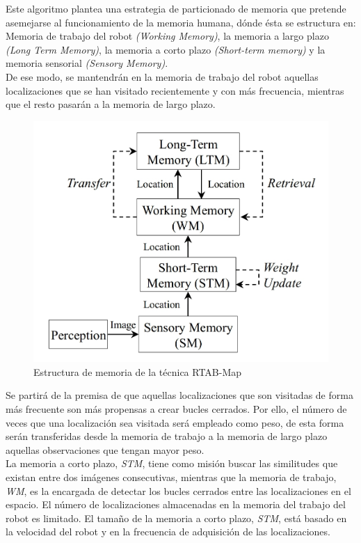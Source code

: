 Este algoritmo plantea una estrategia de particionado de memoria que pretende asemejarse al funcionamiento de la memoria humana, 
dónde ésta se estructura en: \\
Memoria de trabajo del robot \textit{(Working Memory)}, la memoria a largo plazo \textit{(Long Term Memory)}, 
la memoria a corto plazo \textit{(Short-term memory)} y la memoria sensorial \textit{(Sensory Memory)}. \\
De ese modo, se mantendrán en la memoria de trabajo del robot aquellas localizaciones que se han visitado recientemente 
y con más frecuencia, mientras que el resto pasarán a la memoria de largo plazo. \\

\begin{figure}[h!]
    \centering
    \includegraphics[width=.4\textwidth]{images/rtabmap_memory}
    \caption{Estructura de memoria de la técnica RTAB-Map}
\end{figure}


Se partirá de la premisa de que aquellas localizaciones que son visitadas de forma más frecuente son más propensas a 
crear bucles cerrados. Por ello, el número de veces que una localización sea visitada será empleado como peso, de 
esta forma serán transferidas desde la memoria de trabajo a la memoria de largo plazo aquellas observaciones que 
tengan mayor peso.\\
La memoria a corto plazo, \textit{STM}, tiene como misión buscar las similitudes que existan entre dos imágenes
consecutivas, mientras que la memoria de trabajo, \textit{WM}, es la encargada de detectar los bucles cerrados entre las
localizaciones en el espacio. El número de localizaciones almacenadas en la memoria del trabajo del robot es
limitado. El tamaño de la memoria a corto plazo, \textit{STM}, está basado en la velocidad del robot y en la frecuencia de
adquisición de las localizaciones. \\

